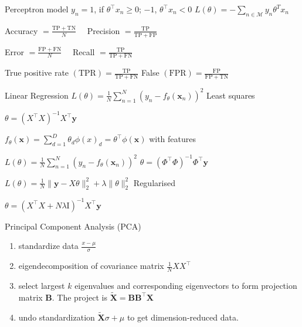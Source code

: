 \documentclass[UTF8,a4paper]{article}
\begin{document}
\begin{cheatsheetblock}{Perceptron model}
    $y_n = 1$, if $\theta^\top x_n \geq 0$; $-1$, $\theta^\top x_n < 0$ \hfill $L(\theta)=-\sum_{n \in \mathscr{M}} y_n \theta^T x_n$

    Accuracy $=\frac{\mathrm{TP}+\mathrm{TN}}{N} \quad$ Precision $=\frac{\mathrm{TP}}{\mathrm{TP}+\mathrm{FP}}$ 

    Error $=\frac{\mathrm{FP}+\mathrm{FN}}{N} \quad$ Recall $=\frac{\mathrm{TP}}{\mathrm{TP}+\mathrm{FN}} \quad$ 
    
    True positive rate $(\mathrm{TPR})=\frac{\mathrm{TP}}{\mathrm{TP}+\mathrm{FN}}$ \hfill False $(\mathrm{FPR})=\frac{\mathrm{FP}}{\mathrm{FP}+\mathrm{TN}}$
\end{cheatsheetblock}

\begin{cheatsheetblock}{Linear Regression}
    $L(\theta)=\frac{1}{N} \sum_{n=1}^N\left(y_n-f_\theta\left(\mathbf{x}_n\right)\right)^2$ \hfill Least squares 
    
    $\theta=\left(X^{\top} X\right)^{-1} X^{\top} \mathbf{y}$

    $f_\theta(\mathbf{x})=\sum_{d=1}^D \theta_d \phi(x)_d=\theta^{\top} \phi(\mathbf{x})$ \hfill with features

    $L(\theta)=\frac{1}{N} \sum_{n=1}^N\left(y_n-f_\theta\left(\mathbf{x}_n\right)\right)^2$ \hfill $\theta=\left(\Phi^{\top} \Phi\right)^{-1} \Phi^{\top} \mathbf{y}$

    $L(\theta)=\frac{1}{N}\|\mathbf{y}-X \theta\|_2^2+\lambda\|\theta\|_2^2$ \hfill Regularised

    $\theta=\left(X^{\top} X+N \lambda \mathrm{I}\right)^{-1} X^{\top} \mathbf{y}$
\end{cheatsheetblock}

\begin{cheatsheetblock}{Principal Component Analysis (PCA)}
\begin{enumerate}
    \item standardize data $\frac{x-\mu}{\sigma}$
    \item eigendecomposition of covariance matrix $\frac{1}{N}XX^\top$
    \item select largest $k$ eigenvalues and corresponding eigenvectors to form projection matrix $\bm{B}$. The project is $\tilde{\bm{X}} = \bm{B}\bm{B}^\top \bm{X}$
    \item undo standardization $\tilde{\bm{X}} \sigma + \mu$ to get dimension-reduced data.
\end{enumerate}


\end{cheatsheetblock}

\end{document}
